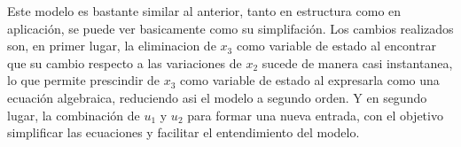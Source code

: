 \documentclass{article}
\begin{document}
    \cite{model}

    \vspace{0.5cm}

Este modelo es bastante similar al anterior, tanto en estructura como en
aplicación, se puede ver basicamente como su simplifación. Los cambios
realizados son, en primer lugar, la eliminacion de $x_3$ como variable de
estado al encontrar que su cambio respecto a las variaciones de $x_2$ sucede de
manera casi instantanea, lo que permite prescindir de $x_3$ como variable de
estado al expresarla como una ecuación algebraica, reduciendo asi el modelo a
segundo orden.  Y en segundo lugar, la combinación de $u_1$ y $u_2$ para formar una
nueva entrada, con el objetivo simplificar las ecuaciones y facilitar el
entendimiento del modelo.



\end{document}

